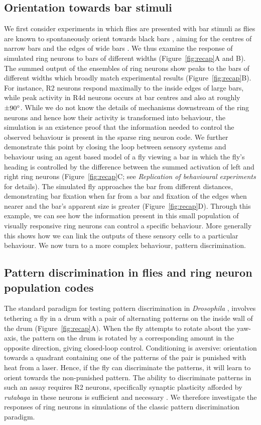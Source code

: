 \documentclass[10pt]{article}
\begin{document}
\subsection*{Orientation towards bar stimuli}
We first consider experiments in which flies are presented with bar stimuli as flies are known to spontaneously orient towards black bars \cite{Gotz1987}, aiming for the centres of narrow bars and the edges of wide bars \cite{Osorio1990}. We thus examine the response of simulated ring neurons to bars of different widths (Figure~\ref{fig:recap}A and B). The summed output of the ensembles of ring neurons show peaks to the bars of different widths which broadly match experimental results (Figure~\ref{fig:recap}B). For instance, R2 neurons respond maximally to the inside edges of large bars, while peak activity in R4d neurons occurs at bar centres and also at roughly $\pm 90\degree$. While we do not know the details of mechanisms downstream of the ring neurons and hence how their activity is transformed into behaviour, the simulation is an existence proof that the information needed to control the observed behaviour is present in the sparse ring neuron code. 
We further demonstrate this point by closing the loop between sensory systems and behaviour using an agent based model of a fly viewing a bar in which the fly’s heading is controlled by the difference between the summed activation of left and right ring neurons (Figure~\ref{fig:recap}C; see \emph{Replication of behavioural experiments} for details). The simulated fly approaches the bar from different distances, demonstrating bar fixation when far from a bar and fixation of the edges when nearer and the bar’s apparent size is greater (Figure~\ref{fig:recap}D). Through this example, we can see how the information present in this small population of visually responsive ring neurons can control a specific behaviour. More generally this shows how we can link the outputs of these sensory cells to a particular behaviour. We now turn to a more complex behaviour, pattern discrimination. 

\subsection*{Pattern discrimination in flies and ring neuron population codes}
The standard paradigm for testing pattern discrimination in \emph{Drosophila} \cite{Pan2009,Liu2006,Ernst1999,Dill1993}, involves tethering a fly in a drum with a pair of alternating patterns on the inside wall of the drum (Figure~\ref{fig:recap}A). When the fly attempts to rotate about the yaw-axis, the pattern on the drum is rotated by a corresponding amount in the opposite direction, giving closed-loop control. Conditioning is aversive: orientation towards a quadrant containing one of the patterns of the pair is punished with heat from a laser. Hence, if the fly can discriminate the patterns, it will learn to orient towards the non-punished pattern. The ability to discriminate patterns in such an assay requires R2 neurons, specifically synaptic plasticity afforded by \emph{rutabaga} in these neurons is sufficient and necessary \cite{Pan2009,Wang2008,Liu2006,Ernst1999}. We therefore investigate the responses of ring neurons in simulations of the classic pattern discrimination paradigm.
\end{document}
